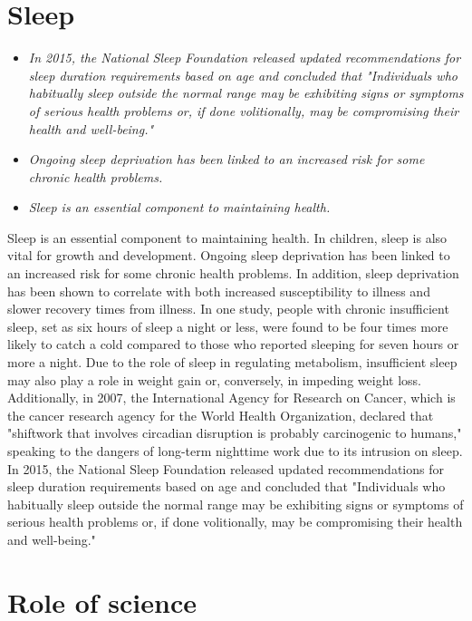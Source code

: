 \section{Sleep}\label{sleep}

\begin{itemize}
\item
  \emph{In 2015, the National Sleep Foundation released updated
  recommendations for sleep duration requirements based on age and
  concluded that "Individuals who habitually sleep outside the normal
  range may be exhibiting signs or symptoms of serious health problems
  or, if done volitionally, may be compromising their health and
  well-being."}
\item
  \emph{Ongoing sleep deprivation has been linked to an increased risk
  for some chronic health problems.}
\item
  \emph{Sleep is an essential component to maintaining health.}
\end{itemize}

Sleep is an essential component to maintaining health. In children,
sleep is also vital for growth and development. Ongoing sleep
deprivation has been linked to an increased risk for some chronic health
problems. In addition, sleep deprivation has been shown to correlate
with both increased susceptibility to illness and slower recovery times
from illness. In one study, people with chronic insufficient sleep, set
as six hours of sleep a night or less, were found to be four times more
likely to catch a cold compared to those who reported sleeping for seven
hours or more a night. Due to the role of sleep in regulating
metabolism, insufficient sleep may also play a role in weight gain or,
conversely, in impeding weight loss. Additionally, in 2007, the
International Agency for Research on Cancer, which is the cancer
research agency for the World Health Organization, declared that
"shiftwork that involves circadian disruption is probably carcinogenic
to humans," speaking to the dangers of long-term nighttime work due to
its intrusion on sleep. In 2015, the National Sleep Foundation released
updated recommendations for sleep duration requirements based on age and
concluded that "Individuals who habitually sleep outside the normal
range may be exhibiting signs or symptoms of serious health problems or,
if done volitionally, may be compromising their health and well-being."

\section{Role of science}\label{role-of-science}


